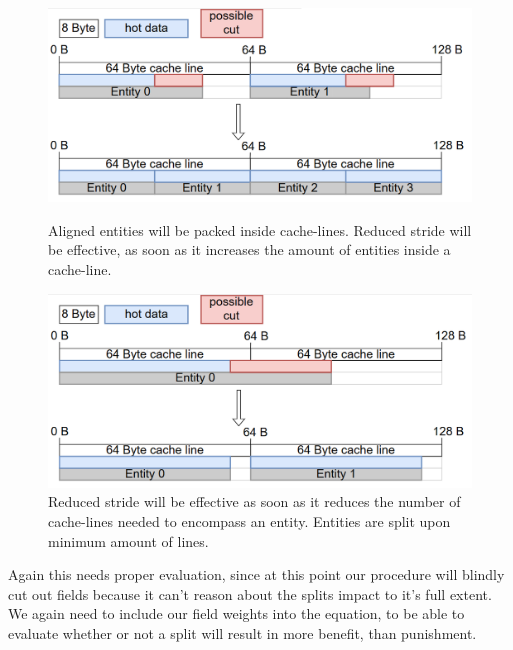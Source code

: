 \begin{figure}[ht]
	\begin{minipage}[b]{0.5\linewidth}
		\centering
		\includegraphics[width=\textwidth,height=.6\textwidth]{PICs/opt_possibility_1}
		\caption{Aligned entities will be packed inside cache-lines. Reduced stride will be effective, as soon as it increases the amount of entities inside a cache-line.}
		\label{opt_p_1}
	\end{minipage}
	\hspace{0.5cm}
	\begin{minipage}[b]{0.5\linewidth}
		\centering
		\includegraphics[width=\textwidth,height=.6\textwidth]{PICs/opt_possibility_2}
		\caption{Reduced stride will be effective as soon as it reduces the number of cache-lines needed to encompass an entity. Entities are split upon minimum amount of lines.}
		\label{opt_p_2}
	\end{minipage}
\end{figure}
Again this needs proper evaluation, since at this point our procedure will blindly cut out fields because it can't reason about the splits impact to it's full extent. We again need to include our field weights into the equation, to be able to evaluate whether or not a split will result in more benefit, than punishment.
